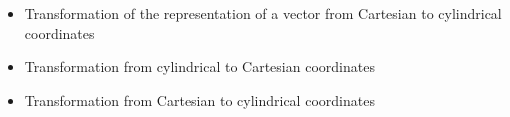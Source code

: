 \begin{ELjoin}

\begin{itemize}
\tightlist
\item
  Transformation of the representation of a vector from Cartesian to cylindrical coordinates
\end{itemize}

\begin{ELimportant}{}


\end{ELimportant}

\end{ELjoin}

\begin{ELunit}

\begin{itemize}
\tightlist
\item
  Transformation from cylindrical to Cartesian coordinates
\end{itemize}


\begin{itemize}
\tightlist
\item
  Transformation from Cartesian to cylindrical coordinates
\end{itemize}



\end{ELunit}

\ELhold


